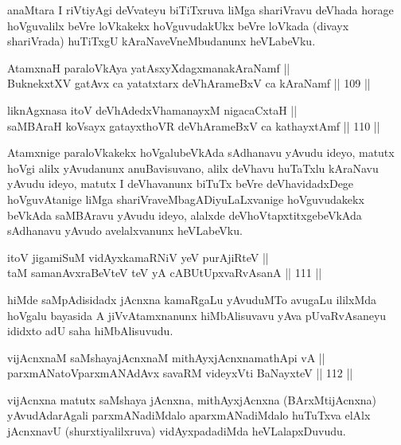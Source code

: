 \begin{artha}
anaMtara I riVtiyAgi deVvateyu biTiTxruva liMga shariVravu deVhada
horage hoVguvalilx beVre loVkakekx hoVguvudakUkx beVre loVkada (divayx
shariVrada) huTiTxgU kAraNaveVneMbudanunx heVLabeVku.
\end{artha}

\begin{shl}
AtamxnaH paraloVkAya yatAsxyXdagxmanakAraNamf ||  \\
BuknekxtXV gatAvx ca yatatxtarx deVhArameBxV ca kAraNamf \hfill || 109 ||  
\end{shl}

\begin{shl}
liknAgxnasa itoV deVhAdedxVhamanayxM nigacaCxtaH || \\
saMBAraH koV\s sayx gatayxthoVR deVhArameBxV ca kathayxtAmf \hfill || 110 ||  
\end{shl}

\begin{artha}
Atamxnige paraloVkakekx hoVgalubeVkAda sAdhanavu yAvudu ideyo, matutx
hoVgi alilx yAvudanunx anuBavisuvano, alilx deVhavu huTaTxlu kAraNavu
yAvudu ideyo, matutx I deVhavanunx biTuTx beVre deVhavidadxDege
hoVguvAtanige liMga shariVraveMbagADiyuLaLxvanige hoVguvudakekx
beVkAda saMBAravu yAvudu ideyo, alalxde deVhoVtapxtitxgebeVkAda
sAdhanavu yAvudo avelalxvanunx heVLabeVku.
\end{artha}


\begin{shl}
itoV jigamiSuM vidAyxkamaRNiV yeV purA\s jiRteV || \\
taM samanAvxraBeVteV teV yA cABUtUpxvaRvAsanA \hfill || 111 ||  
\end{shl}

\begin{artha}
hiMde saMpAdisidadx jAcnxna kamaRgaLu yAvuduMTo avugaLu ililxMda
hoVgalu bayasida A jiVvAtamxnanunx hiMbAlisuvavu yAva pUvaRvAsaneyu
ididxto adU saha hiMbAlisuvudu.
\end{artha}

\begin{shl}
vijAcnxnaM saMshayajAcnxnaM mithAyxjAcnxnamathApi vA || \\
parxmANatoV\s parxmANAdAvx savaRM videyxVti BaNayxteV \hfill || 112 ||  
\end{shl}

\begin{artha}
vijAcnxna matutx saMshaya jAcnxna, mithAyxjAcnxna (BArxMtijAcnxna)
yAvudAdarAgali parxmANadiMdalo aparxmANadiMdalo huTuTxva elAlx
jAcnxnavU (shurxtiyalilxruva) vidAyxpadadiMda heVLalapxDuvudu.
\end{artha}

